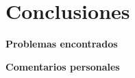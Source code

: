 \documentclass[12pt]{article}
\begin{document}



\newpage
\section{Conclusiones}


\vspace{0.2cm}

\centerline{\textbf{Problemas encontrados}}

\vspace{0.5cm}


\vspace{0.5cm}

\centerline{\textbf{Comentarios personales}}

\vspace{0.5cm}

\end{document}
